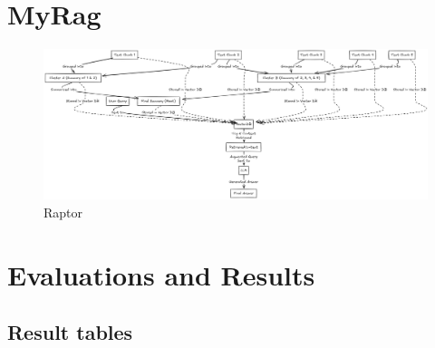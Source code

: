 \documentclass{scrartcl}
\begin{document}

\section{MyRag}



\begin{figure}[H]
	\begin{center}
		\includegraphics[scale=0.1]{raptor_final.png}
	\end{center}
	\caption{Raptor}
	\label{fig:ascent}
\end{figure}


\section{Evaluations and Results}


\subsection{Result tables}
\end{document}
